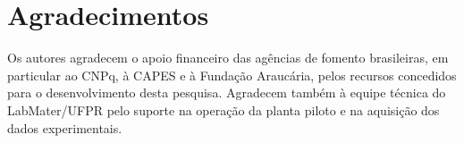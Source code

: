
\section*{Agradecimentos}

Os autores agradecem o apoio financeiro das agências de fomento brasileiras,
em particular ao CNPq, à CAPES e à Fundação Araucária, pelos recursos
concedidos para o desenvolvimento desta pesquisa. Agradecem também à equipe
técnica do LabMater/UFPR pelo suporte na operação da planta piloto e na
aquisição dos dados experimentais.

